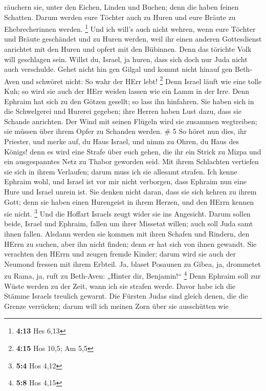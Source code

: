 räuchern sie, unter den Eichen, Linden und Buchen; denn die haben feinen
Schatten. Darum werden eure Töchter auch zu Huren und eure Bräute zu
Ehebrecherinnen werden. \footnote{\textbf{4:13} Hes 6,13} 
Und ich will's auch nicht wehren, wenn eure Töchter und Bräute
geschändet und zu Huren werden, weil ihr einen anderen Gottesdienst
anrichtet mit den Huren und opfert mit den Bübinnen. Denn das törichte
Volk will geschlagen sein.  Willst du, Israel, ja huren,
dass sich doch nur Juda nicht auch verschulde. Gehet nicht hin gen
Gilgal und kommt nicht hinauf gen Beth-Aven und schwöret nicht: So wahr
der HErr lebt! \footnote{\textbf{4:15} Hos 10,5; Am 5,5} 
Denn Israel läuft wie eine tolle Kuh; so wird sie auch der HErr weiden
lassen wie ein Lamm in der Irre.  Denn Ephraim hat sich zu
den Götzen gesellt; so lass ihn hinfahren.  Sie haben sich
in die Schwelgerei und Hurerei gegeben; ihre Herren haben Lust dazu,
dass sie Schande anrichten.  Der Wind mit seinen Flügeln
wird sie zusammen wegtreiben; sie müssen über ihrem Opfer zu Schanden
werden. \# 5  So höret nun dies, ihr Priester, und merke
auf, du Haus Israel, und nimm zu Ohren, du Haus des Königs! denn es wird
eine Strafe über euch gehen, die ihr ein Strick zu Mizpa und ein
ausgespanntes Netz zu Thabor geworden seid.  Mit ihrem
Schlachten vertiefen sie sich in ihrem Verlaufen; darum muss ich sie
allesamt strafen.  Ich kenne Ephraim wohl, und Israel ist
vor mir nicht verborgen, dass Ephraim nun eine Hure und Israel unrein
ist.  Sie denken nicht daran, dass sie sich kehren zu ihrem
Gott; denn sie haben einen Hurengeist in ihrem Herzen, und den HErrn
kennen sie nicht. \footnote{\textbf{5:4} Hos 4,12}  Und die
Hoffart Israels zeugt wider sie ins Angesicht. Darum sollen beide,
Israel und Ephraim, fallen um ihrer Missetat willen; auch soll Juda samt
ihnen fallen.  Alsdann werden sie kommen mit ihren Schafen
und Rindern, den HErrn zu suchen, aber ihn nicht finden; denn er hat
sich von ihnen gewandt.  Sie verachten den HErrn und zeugen
fremde Kinder; darum wird sie auch der Neumond fressen mit ihrem
Erbteil.  Ja, blaset Posaunen zu Gibea, ja, drommetet zu
Rama, ja, ruft zu Beth-Aven: „Hinter dir, Benjamin!{}`` \footnote{\textbf{5:8}
  Hos 4,15}  Denn Ephraim soll zur Wüste werden zu der Zeit,
wann ich sie strafen werde. Davor habe ich die Stämme Israels treulich
gewarnt.  Die Fürsten Judas sind gleich denen, die die
Grenze verrücken; darum will ich meinen Zorn über sie ausschütten wie
